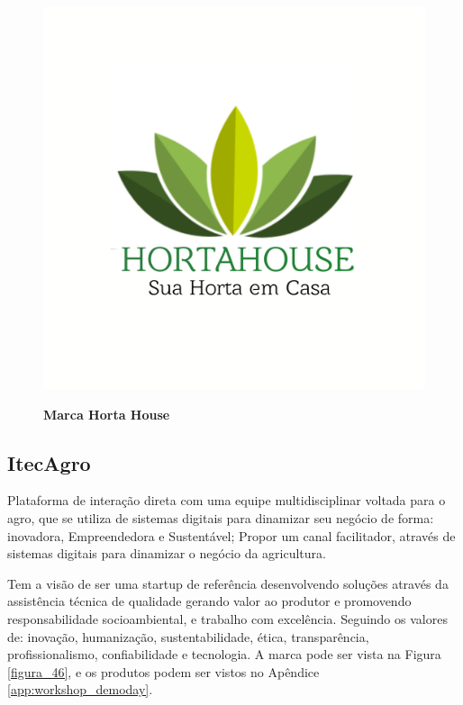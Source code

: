 \begin{figure}[H]
\centering
\caption{\textbf{Marca Horta House}}
\includegraphics[scale=0.08]{Imagens/hortahouse.png}
\label{figura_25}
\end{figure}

\subsection{ItecAgro}

Plataforma de interação direta com uma equipe multidisciplinar voltada para o agro, que se utiliza de sistemas digitais para dinamizar seu negócio de forma: inovadora, Empreendedora e Sustentável; Propor um canal facilitador, através de sistemas digitais para dinamizar o negócio da agricultura.

Tem a visão de ser uma startup de referência desenvolvendo soluções através da assistência técnica de qualidade gerando valor ao produtor e promovendo responsabilidade socioambiental, e trabalho com excelência.
Seguindo os valores de: inovação, humanização, sustentabilidade, ética, transparência, profissionalismo, confiabilidade e tecnologia. A marca pode ser vista na Figura \ref{figura_46}, e os produtos podem ser vistos no Apêndice \ref{app:workshop_demoday}.

